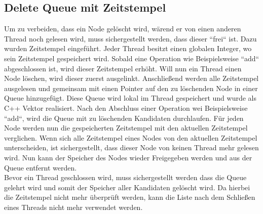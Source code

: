 \subsection{Delete Queue mit Zeitstempel}
Um zu verbeiden, dass ein Node gelöscht wird, wärend er von einen anderen Thread noch gelesen wird, muss sichergestellt werden, dass dieser “frei“ ist. 
Dazu wurden Zeitstempel eingeführt. Jeder Thread besitzt einen globalen Integer, wo sein Zeitstempel gespeichert wird. Sobald eine Operation
wie Beispielsweise “add“ abgeschlossen ist, wird dieser Zeitstempel erhöht.  Will nun ein Thread einen Node löschen, wird dieser zuerst ausgelinkt. 
Anschließend werden alle Zeitstempel ausgelesen und gemeinsam mit einen Pointer auf den zu löschenden Node in einer Queue hinzugefügt. Diese 
Queue wird lokal im Thread gespeichert und wurde als C++ Vektor realisiert. Nach den Abschluss einer Operation wei Beispielsweise “add“, wird 
die Queue mit zu löschenden Kandidaten durchlaufen. Für jeden Node werden nun die gespeicherten Zeitstempel mit den aktuellen Zeitstempel verglichen. 
Wenn sich alle Zeitstempel eines Nodes von den aktuellen Zeitstempel unterscheiden, ist sichergestellt, dass dieser Node von keinen Thread mehr gelesen wird. 
Nun kann der Speicher des Nodes wieder Freigegeben werden und aus der Queue entfernt werden. 
\\Bevor ein Thread geschlossen wird, muss sichergestellt werden
dass die Queue gelehrt wird und somit der Speicher aller Kandidaten gelöscht wird. Da hierbei die Zeitstempel nicht mehr überprüft werden,
kann die Liste nach dem Schließen eines Threads nicht mehr verwendet werden. 
